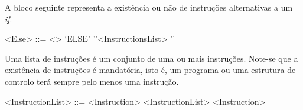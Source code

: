 A bloco seguinte representa a existência ou não de instruções alternativas a um
\emph{if}. 

\begin{grammar}
<Else> ::= <>
\alt `ELSE' '{'<InstructionsList> '}'
\end{grammar}

Uma lista de instruções é um conjunto de uma ou mais instruções. Note-se que
a existência de instruções é mandatória, isto é, um programa ou uma estrutura de
controlo terá sempre pelo menos uma instrução.

\begin{grammar}
<InstructionList> ::= <Instruction>
\alt <InstructionList> <Instruction>  
\end{grammar}











